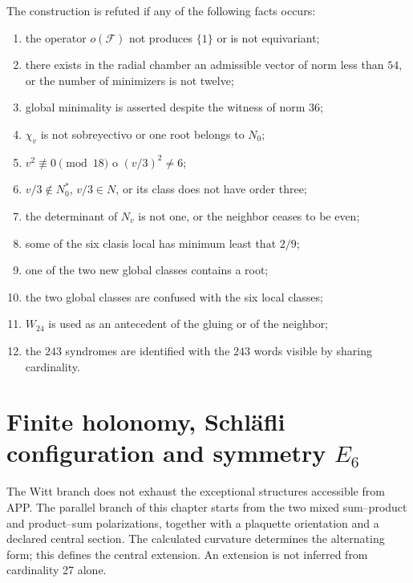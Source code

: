 \begin{criterion}
The construction is refuted if any of the following facts occurs:
\begin{enumerate}
 \item the operator \(o(\mathcal F)\) not produces \(\{1\}\) or is not
       equivariant;
 \item there exists in the radial chamber an admissible vector of norm less than
       \(54\), or the number of minimizers is not twelve;
 \item global minimality is asserted despite the witness of norm \(36\);
 \item \(\chi_v\) is not sobreyectivo or one root belongs to \(N_0\);
 \item \(v^2\not\equiv0\pmod{18}\) o \((v/3)^2\neq6\);
 \item \(v/3\notin N_0^*\), \(v/3\in N\), or its class does not have order three;
 \item the determinant of \(N_v\) is not one, or the neighbor ceases to be even;
 \item some of the six clasis local has minimum least that \(2/9\);
 \item one of the two new global classes contains a root;
 \item the two global classes are confused with the six local classes;
 \item \(W_{24}\) is used as an antecedent of the gluing or of the neighbor;
 \item the \(243\) syndromes are identified with the \(243\) words
       visible by sharing cardinality.
\end{enumerate}
\end{criterion}


\section{Finite holonomy, Schläfli configuration and symmetry \texorpdfstring{\(E_6\)}{E6}}
\label{p12-83-c20-s6:chap:holonomia-schlafli-e6-nuevo}

The Witt branch does not exhaust the exceptional structures accessible from
APP. The parallel branch of this chapter starts from the two mixed
sum--product and product--sum polarizations, together with a plaquette
orientation and a declared central section. The calculated curvature determines
the alternating form; this defines the central extension. An
extension is not inferred from cardinality 27 alone.

